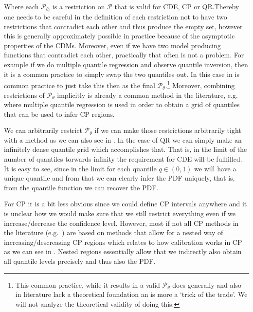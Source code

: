 Where each $\mathscr{P}_{\theta_i}$ is a restriction on $\mathcal{P}$ that is valid for CDE, CP or QR.\@ Thereby one needs to be careful in the definition of each restriction not to have two restrictions that contradict each other and thus produce the empty set, however this is generally approximately possible in practice because of the asymptotic properties of the CDMs. Moreover, even if we have two model producing functions that contradict each other, practically that often is not a problem. For example if we do multiple quantile regression and observe quantile inversion, then it is a common practice to simply swap the two quantiles out. In this case in is common practice to just take this then as the final $\mathcal{P}_{\theta}$.\footnote{This common practice, while it results in a valid $\mathcal{P}_{\theta}$ does generally and also in literature lack a theoretical foundation an is more a `trick of the trade'. We will not analyze the theoretical validity of doing this.} Moreover, combining restrictions of $\mathcal{P}_\theta$ implicitly is already a common method in the literature, e.g.~\cite{sesia2021conformal} where multiple quantile regression is used in order to obtain a grid of quantiles that can be used to infer CP regions.

We can arbitrarily restrict $\mathcal{P}_\theta$ if we can make those restrictions arbitrarily tight with a method as we can also see in . In the case of QR we can simply make an infinitely dense quantile grid which accomplishes that. That is, in the limit of the number of quantiles torwards infinity the requirement for CDE will be fullfilled. It is easy to see, since in the limit for each quantile $q\in(0,1)$ we will have a unique quantile and from that we can clearly infer the PDF uniquely, that is, from the quantile function we can recover the PDF.\@

For CP it is a bit less obvious since we could define CP intervals anywhere and it is unclear how we would make sure that we still restrict everything even if we increase/decrease the confidence level. However, most if not all CP methods in the literature (e.g.~\cite{sesia2021conformal, chernozhukov2021distributional}) are based on methods that allow for a nested way of increasing/descreasing CP regions which relates to how calibration works in CP as we can see in . Nested regions essentially allow that we indirectly also obtain all quantile levels precisely and thus also the PDF.\@

